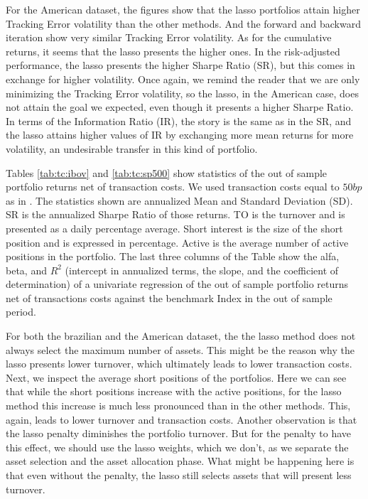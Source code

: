 \documentclass[12pt,oneside,a4paper]{memoir}
\begin{document}
For the American dataset, the figures show that the lasso portfolios attain higher Tracking Error volatility than the other methods.
And the forward and backward iteration show very similar Tracking Error volatility.
As for the cumulative returns, it seems that the lasso presents the higher ones.
In the risk-adjusted performance, the lasso presents the higher Sharpe Ratio (SR), but this comes in exchange for higher volatility.
Once again, we remind the reader that we are only minimizing the Tracking Error volatility, so the lasso, in the American case, does not attain the goal we expected, even though it presents a higher Sharpe Ratio.
In terms of the Information Ratio (IR), the story is the same as in the SR, and the lasso attains higher values of IR by exchanging more mean returns for more volatility, an undesirable transfer in this kind of portfolio.


Tables \ref{tab:tc:ibov} and \ref{tab:tc:sp500} show statistics of the out of sample portfolio returns net of transaction costs.
We used transaction costs equal to $50bp$ as in .
The statistics shown are annualized Mean and Standard Deviation (SD).
SR is the annualized Sharpe Ratio of those returns.
TO is the turnover and is presented as a daily percentage average.
Short interest is the size of the short position and is expressed in percentage.
Active is the average number of active positions in the portfolio.
The last three columns of the Table show the alfa, beta, and $R^2$ (intercept in annualized terms, the slope, and the coefficient of determination) of a univariate regression of the out of sample portfolio returns net of transactions costs against the benchmark Index in the out of sample period.

For both the brazilian and the American dataset, the the lasso method does not always select the maximum number of assets.
This might be the reason why the lasso presents lower turnover, which ultimately leads to lower transaction costs.
Next, we inspect the average short positions of the portfolios.
Here we can see that while the short positions increase with the active positions, for the lasso method this increase is much less pronounced than in the other methods.
This, again, leads to lower turnover and transaction costs.
Another observation is that the lasso penalty diminishes the portfolio turnover.
But for the penalty to have this effect, we should use the lasso weights, which we don't, as we separate the asset selection and the asset allocation phase.
What might be happening here is that even without the penalty, the lasso still selects assets that will present less turnover.
\end{document}
